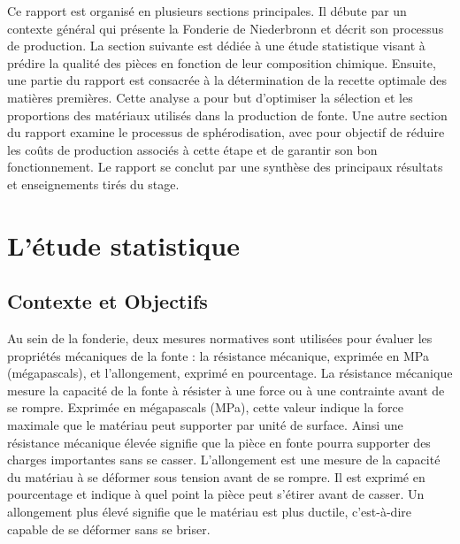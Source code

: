 \documentclass[12pt]{article}
\begin{document}
Ce rapport est organisé en plusieurs sections principales. Il débute par 
un contexte général qui présente la Fonderie de Niederbronn et décrit 
son processus de production. La section suivante est dédiée à une étude 
statistique visant à prédire la qualité des pièces en fonction de leur 
composition chimique. Ensuite, une partie du rapport est consacrée à la 
détermination de la recette optimale des matières premières. Cette analyse 
a pour but d'optimiser la sélection et les proportions des matériaux 
utilisés dans la production de fonte. Une autre section du rapport examine 
le processus de sphérodisation, avec pour objectif de réduire les coûts 
de production associés à cette étape et de garantir son bon fonctionnement.
Le rapport se conclut par une synthèse des principaux résultats et 
enseignements tirés du stage.











\section{L'étude statistique}


\subsection{Contexte et Objectifs}

Au sein de la fonderie, deux mesures normatives sont utilisées pour évaluer 
les propriétés mécaniques de la fonte : la résistance mécanique, exprimée 
en MPa (mégapascals), et l'allongement, exprimé en pourcentage. La 
résistance mécanique mesure la capacité de la fonte à résister à une 
force ou à une contrainte avant de se rompre. Exprimée en mégapascals (MPa), 
cette valeur indique la force maximale que le matériau peut supporter par 
unité de surface. Ainsi une résistance mécanique élevée signifie que la 
pièce en fonte pourra supporter des charges importantes sans se casser.
L'allongement est une mesure de la capacité du matériau à se déformer sous 
tension avant de se rompre. Il est exprimé en pourcentage et indique à 
quel point la pièce peut s'étirer avant de casser. Un allongement plus 
élevé signifie que le matériau est plus ductile, c'est-à-dire capable de 
se déformer sans se briser. 
\end{document}

